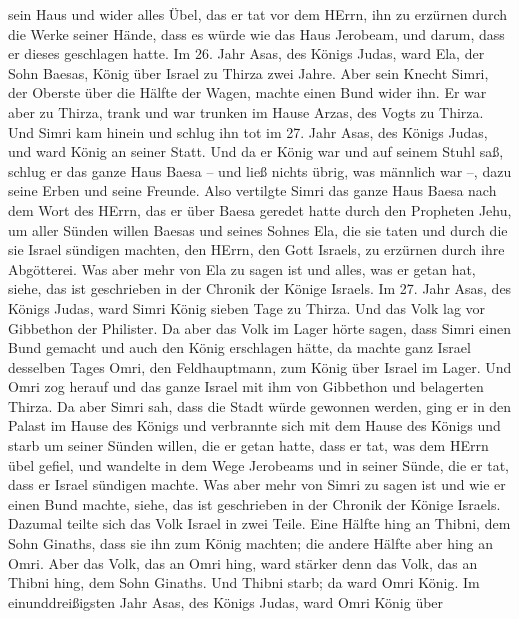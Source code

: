 sein Haus und wider alles Übel, das er tat vor dem HErrn, ihn zu
erzürnen durch die Werke seiner Hände, dass es würde wie das Haus
Jerobeam, und darum, dass er dieses geschlagen hatte.  Im
26. Jahr Asas, des Königs Judas, ward Ela, der Sohn Baesas, König über
Israel zu Thirza zwei Jahre.  Aber sein Knecht Simri, der
Oberste über die Hälfte der Wagen, machte einen Bund wider ihn. Er war
aber zu Thirza, trank und war trunken im Hause Arzas, des Vogts zu
Thirza.  Und Simri kam hinein und schlug ihn tot im 27.
Jahr Asas, des Königs Judas, und ward König an seiner Statt.
 Und da er König war und auf seinem Stuhl saß, schlug er
das ganze Haus Baesa -- und ließ nichts übrig, was männlich war --, dazu
seine Erben und seine Freunde.  Also vertilgte Simri das
ganze Haus Baesa nach dem Wort des HErrn, das er über Baesa geredet
hatte durch den Propheten Jehu,  um aller Sünden willen
Baesas und seines Sohnes Ela, die sie taten und durch die sie Israel
sündigen machten, den HErrn, den Gott Israels, zu erzürnen durch ihre
Abgötterei.  Was aber mehr von Ela zu sagen ist und alles,
was er getan hat, siehe, das ist geschrieben in der Chronik der Könige
Israels.  Im 27. Jahr Asas, des Königs Judas, ward Simri
König sieben Tage zu Thirza. Und das Volk lag vor Gibbethon der
Philister.  Da aber das Volk im Lager hörte sagen, dass
Simri einen Bund gemacht und auch den König erschlagen hätte, da machte
ganz Israel desselben Tages Omri, den Feldhauptmann, zum König über
Israel im Lager.  Und Omri zog herauf und das ganze Israel
mit ihm von Gibbethon und belagerten Thirza.  Da aber Simri
sah, dass die Stadt würde gewonnen werden, ging er in den Palast im
Hause des Königs und verbrannte sich mit dem Hause des Königs und starb
 um seiner Sünden willen, die er getan hatte, dass er tat,
was dem HErrn übel gefiel, und wandelte in dem Wege Jerobeams und in
seiner Sünde, die er tat, dass er Israel sündigen machte. 
Was aber mehr von Simri zu sagen ist und wie er einen Bund machte,
siehe, das ist geschrieben in der Chronik der Könige Israels.
 Dazumal teilte sich das Volk Israel in zwei Teile. Eine
Hälfte hing an Thibni, dem Sohn Ginaths, dass sie ihn zum König machten;
die andere Hälfte aber hing an Omri.  Aber das Volk, das an
Omri hing, ward stärker denn das Volk, das an Thibni hing, dem Sohn
Ginaths. Und Thibni starb; da ward Omri König.  Im
einunddreißigsten Jahr Asas, des Königs Judas, ward Omri König über
